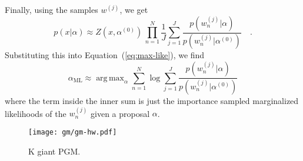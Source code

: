 \documentclass[12pt,preprint]{aastex}
\newcommand{\figlabel}[1]{\label{fig:#1}}
\newcommand{\Eq}[1]{Equation~(\ref{eq:#1})}
\newcommand{\eq}[1]{\Eq{#1}}
\newcommand{\pr}[1]{p ( #1 )}
\DeclareMathOperator*{\argmax}{arg\,max}
\begin{document}
Finally, using the samples $w^{(j)}$, we get
\begin{equation}
    \pr{x | \alpha} \approx Z(x, \alpha^{(0)}) \, \prod_{n = 1}^N
        \frac{1}{J} \sum_{j=1}^{J}
        \frac{\pr{w_n^{(j)} | \alpha}}{\pr{w_n^{(j)} | \alpha^{(0)}}} \quad.
\end{equation}
Substituting this into \eq{max-like}, we find
\begin{equation}
    \alpha_\mathrm{ML} \approx \argmax_\alpha \sum_{n=1}^N \log \sum_{j=1}^{J}
        \frac{\pr{w_n^{(j)} | \alpha}}{\pr{w_n^{(j)} | \alpha^{(0)}}}
\end{equation}
where the term inside the inner sum is just the importance sampled
marginalized likelihoods of the $w_n^{(j)}$ given a proposal $\alpha$.

\begin{figure}[htbp]
    \begin{center}
        \texttt{[image: gm/gm-hw.pdf]}
    \end{center}
    \caption{K giant PGM.\figlabel{gm-hw}}
\end{figure}





\end{document}
